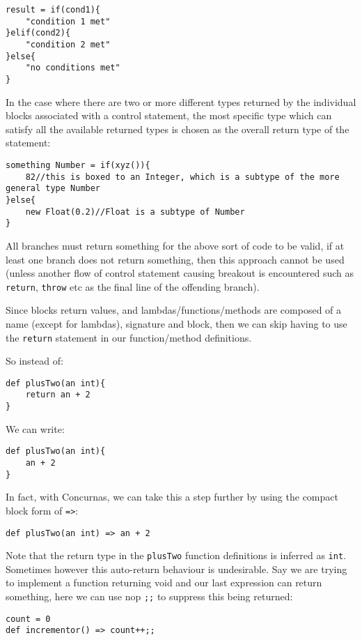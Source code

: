 \documentclass[conc-doc]{subfiles}
\begin{document}
\begin{lstlisting}
result = if(cond1){
	"condition 1 met"
}elif(cond2){
	"condition 2 met"
}else{
	"no conditions met"
}
\end{lstlisting}

In the case where there are two or more different types returned by the individual blocks associated with a control statement, the most specific type which can satisfy all the available returned types is chosen as the overall return type of the statement:

\begin{lstlisting}
something Number = if(xyz()){
	82//this is boxed to an Integer, which is a subtype of the more general type Number
}else{
	new Float(0.2)//Float is a subtype of Number
}
\end{lstlisting}

All branches must return something for the above sort of code to be valid, if at least one branch does not return something, then this approach cannot be used (unless another flow of control statement causing breakout is encountered such as \lstinline{return}, \lstinline{throw} etc as the final line of the offending branch).

Since blocks return values, and lambdas/functions/methods are composed of a name (except for lambdas), signature and block, then we can skip having to use the \lstinline{return} statement in our function/method definitions.

So instead of:

\begin{lstlisting}
def plusTwo(an int){
	return an + 2
}
\end{lstlisting}

We can write:

\begin{lstlisting}
def plusTwo(an int){
	an + 2
}
\end{lstlisting}

In fact, with Concurnas, we can take this a step further by using the compact block form of \lstinline{=>}:
\begin{lstlisting}
def plusTwo(an int) => an + 2
\end{lstlisting}

Note that the return type in the \lstinline{plusTwo} function definitions is inferred as \lstinline{int}. Sometimes however this auto-return behaviour is undesirable. Say we are trying to implement a function returning void and our last expression can return something, here we can use nop \lstinline{;;} to suppress this being returned:
\begin{lstlisting}
count = 0
def incrementor() => count++;;
\end{lstlisting}
\end{document}
